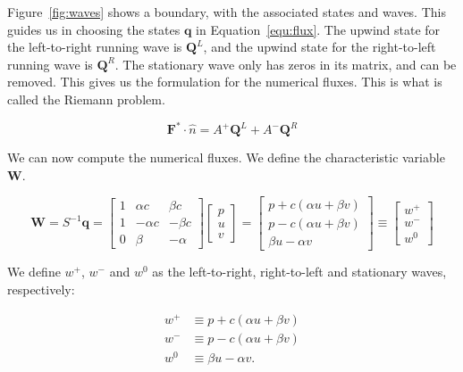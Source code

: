 Figure~\ref{fig:waves} shows a boundary, with the associated states and waves. This guides us in
choosing the states \(\mathbf{q}\) in Equation~\ref{equ:flux}. The upwind state for the
left-to-right running wave is \(\mathbf{Q}^L\), and the upwind state for the right-to-left running
wave is \(\mathbf{Q}^R\). The stationary wave only has zeros in its matrix, and can be removed. This
gives us the formulation for the numerical fluxes. This is what is called the Riemann problem.

\begin{equation} \label{equ:flux_states}
    \mathbf{F}^* \cdot \widehat{n} = A^+ \mathbf{Q}^L + A^- \mathbf{Q}^R
\end{equation}

We can now compute the numerical fluxes. We define the characteristic variable \(\mathbf{W}\).

\begin{equation}
    \mathbf{W} = S^{-1} \mathbf{q} = 
    \begin{bmatrix}
        1 & \alpha c & \beta c \\ 
        1 & -\alpha c & -\beta c \\ 
        0 & \beta & -\alpha
    \end{bmatrix}
    \begin{bmatrix}
        p \\ 
        u \\ 
        v
    \end{bmatrix} = 
    \begin{bmatrix}
        p + c \left( \alpha u + \beta v \right) \\ 
        p - c \left( \alpha u + \beta v \right) \\ 
        \beta u - \alpha v
    \end{bmatrix} \equiv
    \begin{bmatrix}
        w^+ \\
        w^- \\
        w^0
    \end{bmatrix}   
\end{equation}

We define \(w^+\), \(w^-\) and \(w^0\) as the left-to-right, right-to-left and stationary waves,
respectively:

\begin{equation} \label{equ:waves_x}
    \begin{split}
        w^+ & \equiv p + c \left( \alpha u + \beta v \right) \\
        w^- & \equiv p - c \left( \alpha u + \beta v \right) \\
        w^0 & \equiv \beta u - \alpha v.
    \end{split} 
\end{equation}

